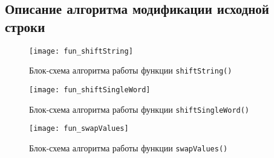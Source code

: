 \subsection{Описание алгоритма модификации исходной строки}
\begin{figure}[H]
  \centering
  \texttt{[image: fun\_shiftString]}
  \caption{Блок-схема алгоритма работы функции \texttt{shiftString()}}
\end{figure}
\begin{figure}[H]
  \centering
  \texttt{[image: fun\_shiftSingleWord]}
  \caption{Блок-схема алгоритма работы функции \texttt{shiftSingleWord()}}
\end{figure}
\begin{figure}[H]
  \centering
  \texttt{[image: fun\_swapValues]}
  \caption{Блок-схема алгоритма работы функции \texttt{swapValues()}}
\end{figure}
